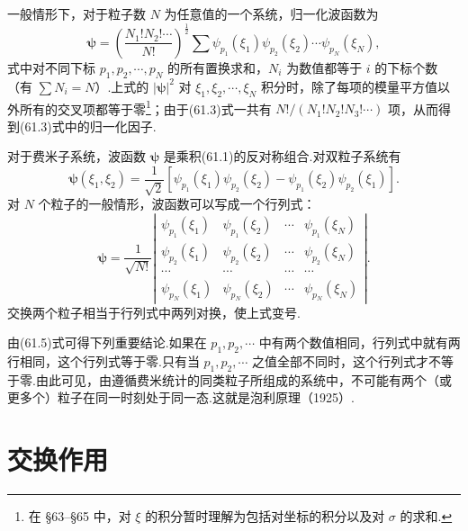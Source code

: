 一般情形下，对于粒子数 $N$ 为任意值的一个系统，归一化波函数为
\begin{equation}
  \boldsymbol{\psi}=\left(\frac{N_1!N_2!\cdots}{N!}\right)^{\frac{1}{2}}\sum\psi_{p_1}(\xi_1)\psi_{p_2}(\xi_2)\cdots\psi_{p_N}(\xi_N),
\end{equation}
式中对不同下标 $p_1,p_2,\cdots,p_N$ 的所有置换求和，$N_i$ 为数值都等于 $i$ 的下标个数（有 $\sum N_i=N$）.上式的 $|\boldsymbol{\psi}|^2$ 对 $\xi_1,\xi_2,\cdots,\xi_N$ 积分时，除了每项的模量平方值以外所有的交叉项都等于零\footnote{在 §63–§65 中，对 $\xi$ 的积分暂时理解为包括对坐标的积分以及对 $\sigma$ 的求和.}；由于(61.3)式一共有 $N!/(N_1!N_2!N_3!\cdots)$ 项，从而得到(61.3)式中的归一化因子.

对于费米子系统，波函数 $\boldsymbol{\psi}$ 是乘积(61.1)的反对称组合.对双粒子系统有
\begin{equation}
  \boldsymbol{\psi}(\xi_1,\xi_2)=\frac{1}{\sqrt{2}}\left[\psi_{p_1}(\xi_1)\psi_{p_2}(\xi_2)-\psi_{p_1}(\xi_2)\psi_{p_2}(\xi_1)\right].
\end{equation}
对 $N$ 个粒子的一般情形，波函数可以写成一个行列式：
\begin{equation}
  \boldsymbol{\psi}=\frac{1}{\sqrt{N!}}\left|\begin{array}{cccc}
  \psi_{p_1}(\xi_1) & \psi_{p_1}(\xi_2) & \cdots & \psi_{p_1}(\xi_N)\\
  \psi_{p_2}(\xi_1) & \psi_{p_2}(\xi_2) & \cdots & \psi_{p_2}(\xi_N)\\
  \cdots & \cdots & \cdots & \cdots\\
  \psi_{p_N}(\xi_1) & \psi_{p_N}(\xi_2) & \cdots & \psi_{p_N}(\xi_N)
  \end{array}\right|.
\end{equation}
交换两个粒子相当于行列式中两列对换，使上式变号.

由(61.5)式可得下列重要结论.如果在 $p_1,p_2,\cdots$ 中有两个数值相同，行列式中就有两行相同，这个行列式等于零.只有当 $p_1,p_2,\cdots$ 之值全部不同时，这个行列式才不等于零.由此可见，由遵循费米统计的同类粒子所组成的系统中，不可能有两个（或更多个）粒子在同一时刻处于同一态.这就是泡利原理（1925）.

\section{交换作用}

